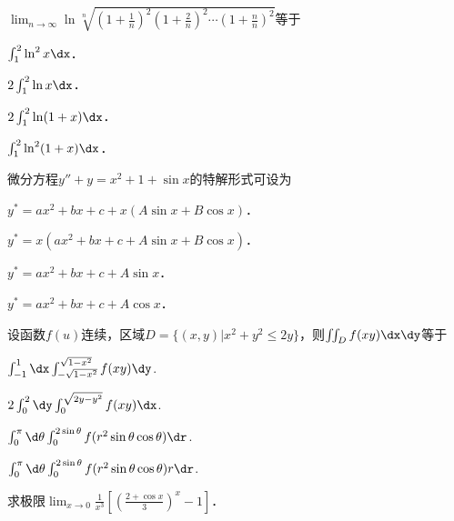 \documentclass[plain,noanswer,medmath]{../../template/jnuexam}
\begin{document}
\begin{problem}
$\lim_{n \to \infty} \ln \sqrt[n]{\left(1 + \frac{1}{n} \right)^2\left(1 + \frac{2}{n} \right)^2
 \cdots \left(1 + \frac{n}{n} \right)^2}$等于\pickout{}
\begin{abcd}
\item $\int_1^2 \ln^2 x\dx$．
\item $2\int_1^2 \ln x\dx$．
\item $2\int_1^2 \ln(1 + x)\dx$．
\item $\int_1^2 \ln^2(1 + x)\dx$．
\end{abcd}
\end{problem}




\begin{problem}
微分方程$y'' + y = x^2 + 1 + \sin x$的特解形式可设为\pickout{}
\begin{abcd}
\item $y^* = ax^2 + bx + c + x(A\sin x + B\cos x)$．
\item $y^* = x(ax^2 + bx + c + A\sin x + B\cos x)$．
\item $y^* = ax^2 + bx + c + A\sin x$．
\item $y^* = ax^2 + bx + c + A\cos x$．
\end{abcd}
\end{problem}


\begin{problem}
设函数$f(u)$连续，区域$D = \{(x,y)|x^2 + y^2 \le 2y\}$，则$\iint_D f(xy)\dx\dy$等于\pickout{}
\begin{abcd}
\item $\int_{-1}^1 \dx \int_{- \sqrt{1 - x^2}}^{\sqrt{1 - x^2}} f(xy)\dy$.
\item $2\int_0^2 \dy \int_0^{\sqrt{2y - y^2}} f(xy)\dx$.
\item $\int_0^{\pi}\d\theta \int_0^{2\sin \theta} f(r^2\sin \theta \cos \theta)\dr$.
\item $\int_0^{\pi}\d\theta \int_0^{2\sin \theta} f(r^2\sin \theta \cos \theta)r\dr$.
\end{abcd}
\end{problem}








\begin{problem}[points=10]
求极限$\lim_{x \to 0} \frac{1}{x^3}\left[\left(\frac{2 + \cos x}{3} \right)^x - 1 \right]$．
\end{problem}
\end{document}
